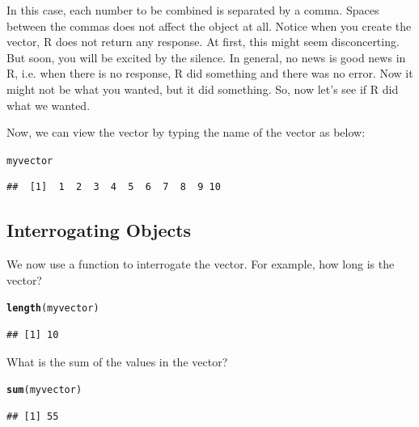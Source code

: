 \documentclass{tufte-handout}\usepackage[]{graphicx}\usepackage[]{xcolor}
\makeatletter
\newcommand{\hlstd}[1]{\textcolor[rgb]{0.345,0.345,0.345}{#1}}%
\newcommand{\hlkwd}[1]{\textcolor[rgb]{0.737,0.353,0.396}{\textbf{#1}}}%
\newenvironment{kframe}{%
 \def\at@end@of@kframe{}%
 \ifinner\ifhmode%
  \def\at@end@of@kframe{\end{minipage}}%
  \begin{minipage}{\columnwidth}%
 \fi\fi%
 \def\FrameCommand##1{\hskip\@totalleftmargin \hskip-\fboxsep
 \colorbox{shadecolor}{##1}\hskip-\fboxsep
     \hskip-\linewidth \hskip-\@totalleftmargin \hskip\columnwidth}%
 \MakeFramed {\advance\hsize-\width
   \@totalleftmargin\z@ \linewidth\hsize
   \@setminipage}}%
 {\par\unskip\endMakeFramed%
 \at@end@of@kframe}
\newenvironment{knitrout}{}{} %
\makeatother
\begin{document}
In this case, each number to be combined is separated by a comma. Spaces between the commas does not affect the object at all. Notice when you create the vector, R does not return any response. At first, this might seem disconcerting. But soon, you will be excited by the silence. In general, no news is good news in R, i.e. when there is no response, R did something and there was no error. Now it might not be what you wanted, but it did something. So, now let's see if R did what we wanted. 

Now, we can view the vector by typing the name of the vector as below:  

\begin{knitrout}
\color{fgcolor}\begin{kframe}
\begin{alltt}
\hlstd{myvector}
\end{alltt}
\begin{verbatim}
##  [1]  1  2  3  4  5  6  7  8  9 10
\end{verbatim}
\end{kframe}
\end{knitrout}

\subsection{Interrogating Objects}

We now use a function to interrogate the vector. For example, how long is the vector?

\begin{knitrout}
\color{fgcolor}\begin{kframe}
\begin{alltt}
\hlkwd{length}\hlstd{(myvector)}
\end{alltt}
\begin{verbatim}
## [1] 10
\end{verbatim}
\end{kframe}
\end{knitrout}

What is the sum of the values in the vector?

\begin{knitrout}
\color{fgcolor}\begin{kframe}
\begin{alltt}
\hlkwd{sum}\hlstd{(myvector)}
\end{alltt}
\begin{verbatim}
## [1] 55
\end{verbatim}
\end{kframe}
\end{knitrout}
\end{document}
